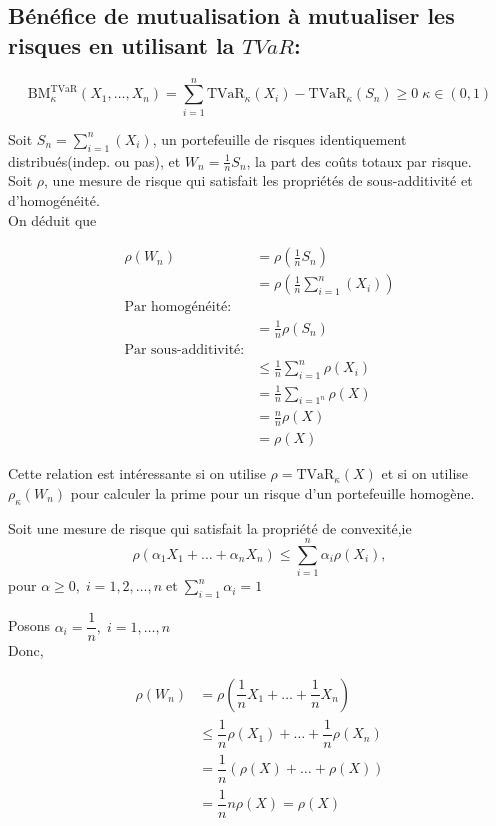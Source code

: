 \subsection{Bénéfice de mutualisation à mutualiser les risques en utilisant la \(TVaR\):}

\[
\text{BM}^{\text{TVaR}}_\kappa(X_1,\dots,X_n)=\sum^n_{i=1}\text{TVaR}_\kappa(X_i) -\text{TVaR}_\kappa(S_n)\geq0\;\kappa\in(0,1)
\]

Soit \(S_n=\sum^n_{i=1}(X_i)\), un portefeuille de risques identiquement
distribués(indep. ou pas), et \(W_n=\frac{1}{n}S_n\), la part des coûts
totaux par risque.\\
Soit \(\rho\), une mesure de risque qui satisfait les propriétés de
sous-additivité et d'homogénéité.\\
On déduit que

\begin{align*}
\rho(W_n)& = \rho\left(\frac{1}{n}S_n\right)\\
& =\rho\left(\frac{1}{n}\sum_{i=1}^n (X_i)\right)\\
\text{Par homogénéité:}\\
& =\frac{1}{n}\rho(S_n)\\
\text{Par sous-additivité:}\\
& \leq\frac{1}{n} \sum^n_{i=1}\rho(X_i)\\
& =\frac{1}{n} \sum_{i=1^n}\rho(X)\\
& =\frac{n}{n}\rho(X)\\
& =\rho(X)
\end{align*}

Cette relation est intéressante si on utilise
\(\rho=\text{TVaR}_\kappa (X)\) et si on utilise \(\rho_\kappa(W_n)\)
pour calculer la prime pour un risque d'un portefeuille homogène.

Soit une mesure de risque qui satisfait la propriété de convexité,ie \[
\rho(\alpha_1 X_1+\dots + \alpha_n X_n) \leq \sum^n_{i=1} \alpha_i\rho\left (X_i\right ),
\] pour
\(\alpha \geq 0,\;i=1,2,\dots,n\;\text{et}\;\sum^n_{i=1} \alpha_i=1\)

Posons \(\alpha_i=\dfrac{1}{n},\;i=1,\dots,n\)\\
Donc,

\begin{align*}
\rho(W_n)& = \rho(\dfrac{1}{n}X_1+\dots+\dfrac{1}{n} X_n)\\
& \leq \dfrac{1}{n} \rho(X_1)+\dots+\dfrac{1}{n}\rho(X_n)\\
& =\dfrac{1}{n}(\rho(X)+\dots+\rho(X))\\
& =\dfrac{1}{n}n \rho(X) = \rho(X)
\end{align*}

